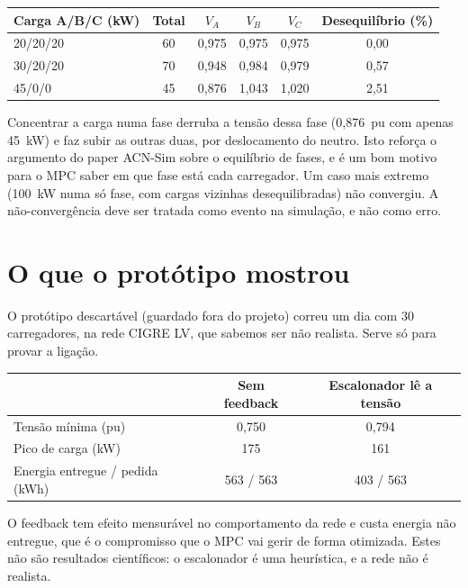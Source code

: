 \documentclass[11pt,a4paper]{article}
\begin{document}
\begin{center}
\small
\begin{tabular}{@{}lccccc@{}}
\toprule
Carga A/B/C (kW) & Total & $V_A$ & $V_B$ & $V_C$ & Desequil\'ibrio (\%) \\
\midrule
20/20/20 & 60 & 0{,}975 & 0{,}975 & 0{,}975 & 0{,}00 \\
30/20/20 & 70 & 0{,}948 & 0{,}984 & 0{,}979 & 0{,}57 \\
45/0/0 & 45 & 0{,}876 & 1{,}043 & 1{,}020 & 2{,}51 \\
\bottomrule
\end{tabular}
\end{center}

Concentrar a carga numa fase derruba a tens\~ao dessa fase (0{,}876~pu com apenas 45~kW) e faz subir as outras duas, por deslocamento do neutro.
Isto refor\c{c}a o argumento do paper ACN-Sim sobre o equil\'ibrio de fases, e \'e um bom motivo para o MPC saber em que fase est\'a cada carregador.
Um caso mais extremo (100~kW numa s\'o fase, com cargas vizinhas desequilibradas) n\~ao convergiu.
A n\~ao-converg\^encia deve ser tratada como evento na simula\c{c}\~ao, e n\~ao como erro.

\section{O que o prot\'otipo mostrou}

O prot\'otipo descart\'avel (guardado fora do projeto) correu um dia com 30 carregadores, na rede CIGRE LV, que sabemos ser n\~ao realista.
Serve s\'o para provar a liga\c{c}\~ao.

\begin{center}
\small
\begin{tabular}{@{}lcc@{}}
\toprule
& Sem feedback & Escalonador l\^e a tens\~ao \\
\midrule
Tens\~ao m\'inima (pu) & 0{,}750 & 0{,}794 \\
Pico de carga (kW) & 175 & 161 \\
Energia entregue / pedida (kWh) & 563 / 563 & 403 / 563 \\
\bottomrule
\end{tabular}
\end{center}

O feedback tem efeito mensur\'avel no comportamento da rede e custa energia n\~ao entregue, que \'e o compromisso que o MPC vai gerir de forma otimizada.
Estes n\~ao s\~ao resultados cient\'ificos: o escalonador \'e uma heur\'istica, e a rede n\~ao \'e realista.
\end{document}
